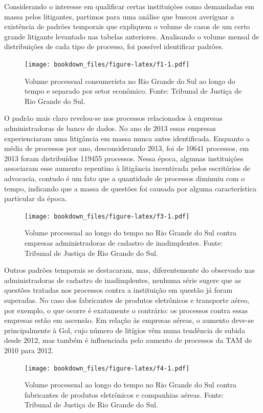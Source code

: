 \documentclass[]{report}
\begin{document}
Considerando o interesse em qualificar certas instituições como
demandadas em massa pelos litigantes, partimos para uma análise que
buscou averiguar a existência de padrões temporais que expliquem o
volume de casos de um certo grande litigante levantado nas tabelas
anteriores. Analisando o volume mensal de distribuições de cada tipo de
processo, foi possível identificar padrões.

\begin{figure}[htbp]
\centering
\texttt{[image: bookdown\_files/figure-latex/f1-1.pdf]}
\caption{\label{fig:f1}Volume processual consumerista no Rio Grande do Sul
ao longo do tempo e separado por setor econômico. Fonte: Tribunal de
Justiça de Rio Grande do Sul.}
\end{figure}

O padrão mais claro revelou-se nos processos relacionados à empresas
administradoras de banco de dados. No ano de 2013 essas empresas
experienciaram uma litigância em massa nunca antes identificada.
Enquanto a média de processos por ano, desconsiderando 2013, foi de
10641 processos, em 2013 foram distribuídos 119455 processos. Nessa
época, algumas instituições associaram esse aumento repentino à
litigância incentivada pelos escritórios de advocacia, contudo é um fato
que a quantidade de processos diminuiu com o tempo, indicando que a
massa de questões foi causada por alguma característica particular da
época.

\begin{figure}[htbp]
\centering
\texttt{[image: bookdown\_files/figure-latex/f3-1.pdf]}
\caption{\label{fig:f3}Volume processual ao longo do tempo no Rio Grande do
Sul contra empresas administradoras de cadastro de inadimplentes. Fonte:
Tribunal de Justiça de Rio Grande do Sul.}
\end{figure}

Outros padrões temporais se destacaram, mas, diferentemente do observado
nas administradoras de cadastro de inadimplentes, nenhuma série sugere
que as questões tratadas nos processos contra a instituição em questão
já foram superadas. No caso dos fabricantes de produtos eletrônicos e
transporte aéreo, por exemplo, o que ocorre é exatamente o contrário: os
processos contra essas empresas estão em ascensão. Em relação às
empresas aéreas, o aumento deve-se principalmente à Gol, cujo número de
litígios vêm numa tendência de subida desde 2012, mas também é
influenciada pelo aumento de processos da TAM de 2010 para 2012.

\begin{figure}[htbp]
\centering
\texttt{[image: bookdown\_files/figure-latex/f4-1.pdf]}
\caption{\label{fig:f4}Volume processual ao longo do tempo no Rio Grande do
Sul contra fabricantes de produtos eletrônicos e companhias aéreas.
Fonte: Tribunal de Justiça de Rio Grande do Sul.}
\end{figure}
\end{document}
